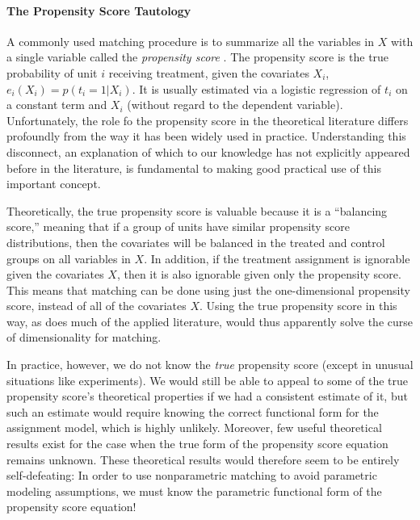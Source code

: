 \documentclass[11pt,titlepage]{article}
\begin{document}
\paragraph{The Propensity Score Tautology}
A commonly used matching procedure is to summarize all the variables
in $X$ with a single variable called the \emph{propensity score}
\citep{RosRub83}.  The propensity score is the true probability of
unit $i$ receiving treatment, given the covariates $X_i$, $e_i(X_i) =
p(t_i=1 | X_i)$.  It is usually estimated via a logistic regression of
$t_i$ on a constant term and $X_i$ (without regard to the dependent
variable).  Unfortunately, the role fo the propensity score in the
theoretical literature differs profoundly from the way it has been
widely used in practice.  Understanding this disconnect, an
explanation of which to our knowledge has not explicitly appeared
before in the literature, is fundamental to making good practical use
of this important concept.

Theoretically, the true propensity score is valuable because it is a
``balancing score,'' meaning that if a group of units have similar
propensity score distributions, then the covariates will be balanced
in the treated and control groups on all variables in $X$.  In
addition, if the treatment assignment is ignorable given the
covariates $X$, then it is also ignorable given only the propensity
score.  This means that matching can be done using just the
one-dimensional propensity score, instead of all of the covariates
$X$.  Using the true propensity score in this way, as does much of the
applied literature, would thus apparently solve the curse of
dimensionality for matching.

In practice, however, we do not know the \emph{true} propensity score
(except in unusual situations like experiments).  We would still be
able to appeal to some of the true propensity score's theoretical
properties if we had a consistent estimate of it, but such an estimate
would require knowing the correct functional form for the assignment
model, which is highly unlikely.  Moreover, few useful theoretical
results exist for the case when the true form of the propensity score
equation remains unknown.  These theoretical results would therefore
seem to be entirely self-defeating: In order to use nonparametric
matching to avoid parametric modeling assumptions, we must know the
parametric functional form of the propensity score equation!
\end{document}
